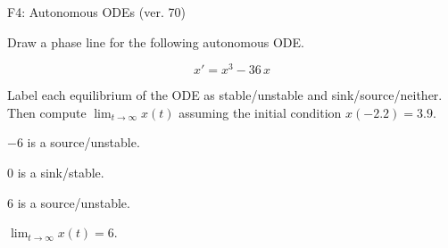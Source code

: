 \begin{exercise}
  \begin{exerciseTitle}F4: Autonomous ODEs (ver. 70)\end{exerciseTitle}
  \begin{exerciseStatement}
    

      Draw a phase line for the following 
      autonomous ODE.
    

    
\[x'= x^{3} - 36 \, x\]

    

      Label each equilibrium of the ODE
      as stable/unstable and sink/source/neither.
      Then compute \(\lim_{t\to\infty}x(t)\)
      assuming the initial condition
      \(x( -2.2 )= 3.9\).
    

  \end{exerciseStatement}
  \begin{exerciseAnswer}
    

      \(-6\) is a source/unstable.
      
        \(0\) is a sink/stable.
      
      \(6\) is a source/unstable.
    

    

      \(\lim_{t\to\infty}x(t)=6\).
    

  \end{exerciseAnswer}
\end{exercise}